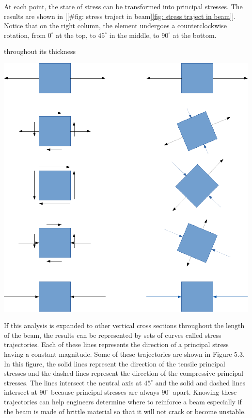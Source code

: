 \documentclass[a4paper,openany,12pt]{book}
\begin{document}
{{At each point, the state of stress can be transformed into principal
stresses. The results are shown in
[[\#fig: stress traject in beam]\ref{fig: stress traject in beam}]. Notice
that on the right column, the element undergoes a counterclockwise
rotation, from \(0^{\circ}\) at the top, to \(45^{\circ}\) in the middle, to
\(90^{\circ}\) at the bottom.


throughout its thickness
\begin{center}
\includegraphics[width=.9\linewidth]{pictures/Simple-load-bearing/stress-traject-beam.pdf}
\label{fig: stress traject in beam}
\end{center}

If this analysis is expanded to other vertical cross sections throughout
the length of the beam, the results can be represented by sets of curves
called stress trajectories. Each of these lines represents the direction
of a principal stress having a constant magnitude. Some of these
trajectories are shown in Figure 5.3. In this figure, the solid lines
represent the direction of the tensile principal stresses and the dashed
lines represent the direction of the compressive principal stresses. The
lines intersect the neutral axis at \(45^{\circ}\) and the solid and dashed
lines intersect at \(90^{\circ}\) because principal stresses are always
\(90^{\circ}\) apart. Knowing these trajectories can help engineers
determine where to reinforce a beam especially if the beam is made of
brittle material so that it will not crack or become unstable.

}}
\end{document}
